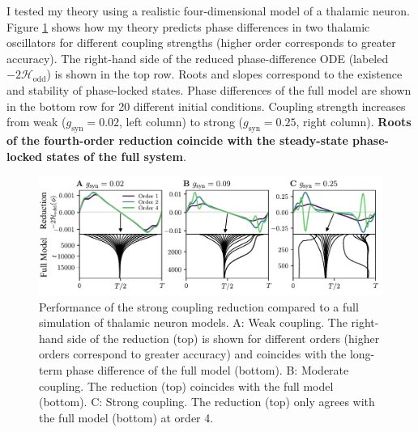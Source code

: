 \documentclass[a4paper,11pt]{article}
\newcommand{\ve}{\varepsilon}
\newcommand{\h}{\mathcal{H}}
\begin{document}
	
	I tested my theory using a realistic four-dimensional model of a thalamic neuron. Figure \ref{fig:thal} shows how my theory predicts phase differences in two thalamic oscillators for different coupling strengths (higher order corresponds to greater accuracy). The right-hand side of the reduced phase-difference ODE (labeled $-2\h_{\text{odd}}$) is shown in the top row. Roots and slopes correspond to the existence and stability of phase-locked states. Phase differences of the full model are shown in the bottom row for 20 different initial conditions. Coupling strength increases from weak ($g_\text{syn}=0.02$, left column) to strong ($g_\text{syn}=0.25$, right column). \textbf{Roots of the fourth-order reduction coincide with the steady-state phase-locked states of the full system}.
	
	\begin{figure}[ht!]
		\centering
		\includegraphics[width=\textwidth]{figures/thal_h_edited.pdf}
		\caption{Performance of the strong coupling reduction compared to a full simulation of thalamic neuron models. A: Weak coupling. The right-hand side of the reduction (top) is shown for different orders (higher orders correspond to greater accuracy) and coincides with the long-term phase difference of the full model (bottom). B: Moderate coupling. The reduction (top) coincides with the full model (bottom). C: Strong coupling. The reduction (top) only agrees with the full model (bottom) at order 4. }\label{fig:thal}
	\end{figure}
	
\end{document}

